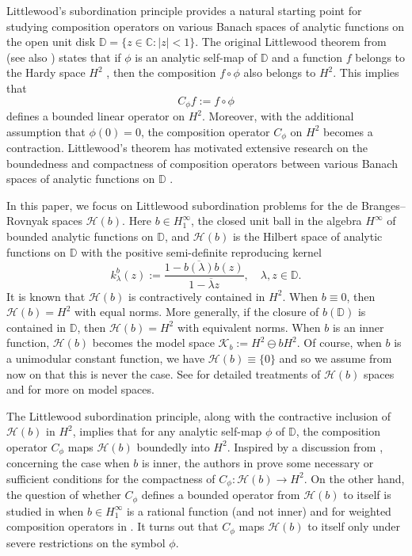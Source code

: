 \documentclass[11pt]{amsart}
\def\C{{\mathbb{C}}}
\def\D{\mathbb{D}}
\def\HH{{\mathcal H}}
\def\KK{{\mathcal K}}
\numberwithin{equation}{section}
\theoremstyle{plain}
\theoremstyle{definition}
\begin{document}
Littlewood's subordination principle provides a natural starting point for studying composition operators on various Banach spaces of analytic functions on the open unit disk $\D = \{z \in \C: |z| < 1\}$. The original Littlewood theorem from \cite{MR1574067} (see also \cite[p.~10]{Duren}) states that if $\phi$ is an analytic self-map of $\D$ and a function $f$ belongs to the Hardy space $H^2$ \cite{Duren},  then the composition $f \circ \phi$ also belongs to $H^2$. This implies that  
$$C_{\phi} f := f \circ \phi$$  defines a bounded linear operator  on $H^2$. Moreover, with the additional assumption that $\phi(0) = 0$,  the composition operator $C_{\phi}$ on $H^2$ becomes a contraction.  Littlewood’s theorem has motivated extensive research on the boundedness and compactness of composition operators between various Banach spaces of analytic functions on $\D$ \cite{CMC, Queff, JShap}.


In this paper, we focus on  Littlewood subordination problems for the de Branges--Rovnyak spaces $\mathcal{H}(b)$. Here $b \in H^{\infty}_{1}$, the closed unit ball in the algebra  $H^{\infty}$ of bounded analytic functions on $\D$, and $\HH(b)$ is  the Hilbert space  of analytic functions on $\D$ with the positive semi-definite reproducing kernel 
\begin{equation}\label{KernelHb}
k^{b}_{\lambda}(z) := \frac{1 -  \overline{b(\lambda)} b(z)} {1 - \overline{\lambda} z}, \quad \lambda, z \in \D.
\end{equation}
It is known that $\HH(b)$ is contractively contained in $H^2$. When $b \equiv 0$, then $\HH(b) = H^2$ with equal norms. More generally, if the closure of $b(\D)$ is contained in $\D$, then $\HH(b) = H^2$ with  equivalent norms. 
When $b$ is an inner function, $\HH(b)$ becomes the  model space $\KK_{b} := H^2 \ominus b H^2$. Of course, when $b$ is a unimodular constant function, we have $\HH(b)  \equiv \{0\}$ and so we assume from now on that this is never the case. See \cite{Hb1-book, Hb2-book, MR1289670} for detailed treatments of $\HH(b)$ spaces and \cite{MR3526203} for more on model spaces.

The Littlewood subordination principle, along with the contractive inclusion of $\HH(b)$ in $H^2$,  implies that for any analytic self-map $\phi$ of $\D$, the composition operator $C_\phi$ maps
$\mathcal{H}(b)$ boundedly into $H^2$. Inspired by a discussion from \cite{MR3411049}, concerning the case when $b$ is inner, the authors in \cite{MR3915413} prove some necessary or sufficient conditions for the compactness of $C_\phi:\mathcal H(b)\to H^2$. On the other hand, the question of whether $C_\phi$ defines a bounded operator  from $\mathcal H(b)$ to itself is studied in \cite{MR4653340} when $b \in H^{\infty}_{1}$ is a rational function (and not inner) and for weighted composition operators in \cite{FricainOstermann}.  It turns out  that $C_{\phi}$ maps $\mathcal{H}(b)$ to itself only under severe
restrictions on the symbol $\phi$. 
\end{document}
